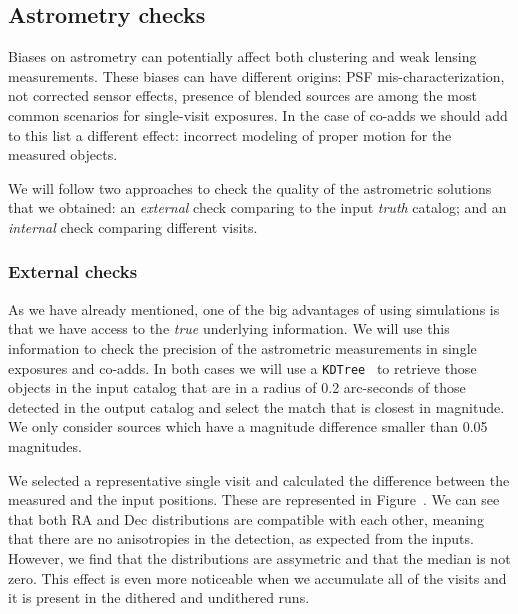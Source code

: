 \documentclass[\docopts]{\docclass}
\begin{document}
\subsection{Astrometry checks}
\label{sec:astrometry_checks}

Biases on astrometry can potentially affect both clustering and weak lensing measurements. These biases
can have different origins: PSF mis-characterization, not corrected sensor effects, presence of blended sources are among
the most common scenarios for single-visit exposures. In the case of co-adds we should add to this list a different effect:
incorrect modeling of proper motion for the measured objects.

We will follow two approaches to check the quality of the astrometric solutions that we obtained: an \textit{external} check
comparing to the input \textit{truth} catalog; and an \textit{internal} check comparing different visits.

\subsubsection{External checks}
\label{sec:external_astrometry}

As we have already mentioned, one of the big advantages of using simulations is that we have access to the \textit{true}
underlying information. We will use this information to check the precision of the astrometric measurements in single exposures
and co-adds. In both cases we will use a \texttt{KDTree}~\citep{scikit-learn} to retrieve those objects in the input catalog
that are in a radius of 0.2 arc-seconds of those detected in the output catalog and select the match that is closest in
magnitude. We only consider sources which have a magnitude difference smaller than 0.05 magnitudes.

We selected a representative single visit and calculated the difference between the measured and the input positions.
These are represented in Figure~. We can see that both RA and Dec distributions are compatible with each
other, meaning that there are no anisotropies in the detection, as expected from the inputs. However, we find that the distributions
are assymetric and that the median is not zero. This effect is even more noticeable when we accumulate all of the visits and
it is present in the dithered and undithered runs.
\end{document}
